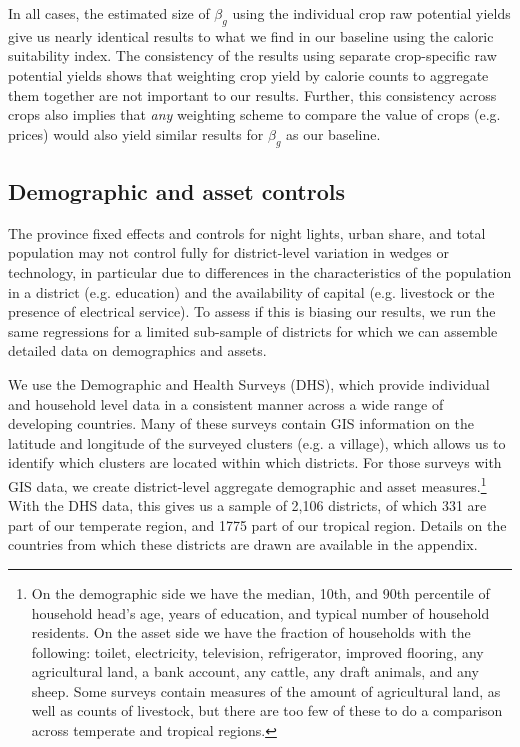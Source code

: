 \documentclass[11pt]{article}
\begin{document}
In all cases, the estimated size of $\beta_g$ using the individual crop raw potential yields give us nearly identical results to what we find in our baseline using the caloric suitability index. The consistency of the results using separate crop-specific raw potential yields shows that weighting crop yield by calorie counts to aggregate them together are not important to our results. Further, this consistency across crops also implies that \textit{any} weighting scheme to compare the value of crops (e.g. prices) would also yield similar results for $\beta_g$ as our baseline. 

\subsection{Demographic and asset controls} 
The province fixed effects and controls for night lights, urban share, and total population may not control fully for district-level variation in wedges or technology, in particular due to differences in the characteristics of the population in a district (e.g. education) and the availability of capital (e.g. livestock or the presence of electrical service). To assess if this is biasing our results, we run the same regressions for a limited sub-sample of districts for which we can assemble detailed data on demographics and assets.

We use the Demographic and Health Surveys (DHS), which provide individual and household level data in a consistent manner across a wide range of developing countries. Many of these surveys contain GIS information on the latitude and longitude of the surveyed clusters (e.g. a village), which allows us to identify which clusters are located within which districts. For those surveys with GIS data, we create district-level aggregate demographic and asset measures.\footnote{On the demographic side we have the median, 10th, and 90th percentile of household head's age, years of education, and typical number of household residents. On the asset side we have the fraction of households with the following: toilet, electricity, television, refrigerator, improved flooring, any agricultural land, a bank account, any cattle, any draft animals, and any sheep. Some surveys contain measures of the amount of agricultural land, as well as counts of livestock, but there are too few of these to do a comparison across temperate and tropical regions.} With the DHS data, this gives us a sample of 2,106 districts, of which 331 are part of our temperate region, and 1775 part of our tropical region. Details on the countries from which these districts are drawn are available in the appendix.
\end{document}

